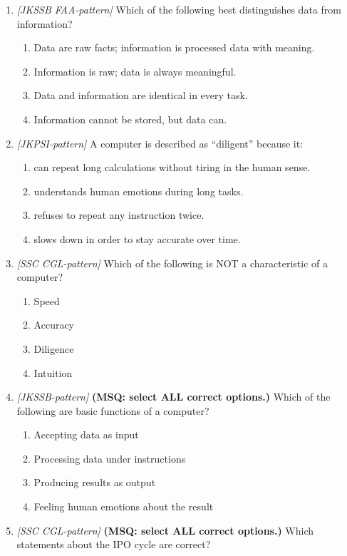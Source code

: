 \begin{enumerate}[label=\textbf{Q\arabic*.}, leftmargin=*]
\item \textit{[JKSSB FAA-pattern]} Which of the following best distinguishes data from information?
  \begin{enumerate}[label=\Alph*.]
    \item Data are raw facts; information is processed data with meaning.
    \item Information is raw; data is always meaningful.
    \item Data and information are identical in every task.
    \item Information cannot be stored, but data can.
  \end{enumerate}
\item \textit{[JKPSI-pattern]} A computer is described as ``diligent'' because it:
  \begin{enumerate}[label=\Alph*.]
    \item can repeat long calculations without tiring in the human sense.
    \item understands human emotions during long tasks.
    \item refuses to repeat any instruction twice.
    \item slows down in order to stay accurate over time.
  \end{enumerate}
\item \textit{[SSC CGL-pattern]} Which of the following is NOT a characteristic of a computer?
  \begin{enumerate}[label=\Alph*.]
    \item Speed
    \item Accuracy
    \item Diligence
    \item Intuition
  \end{enumerate}
\item \textit{[JKSSB-pattern]} \textbf{(MSQ: select ALL correct options.)} Which of the following are basic functions of a computer?
  \begin{enumerate}[label=\Alph*.]
    \item Accepting data as input
    \item Processing data under instructions
    \item Producing results as output
    \item Feeling human emotions about the result
  \end{enumerate}
\item \textit{[SSC CGL-pattern]} \textbf{(MSQ: select ALL correct options.)} Which statements about the IPO cycle are correct?

\end{enumerate}
